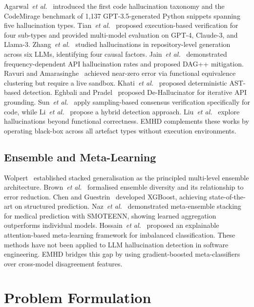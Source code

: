 \documentclass[11pt,a4paper]{article}
\newcommand{\method}{\textsc{EMHD}}
\newcommand{\etal}{\textit{et al.}}
\begin{document}
Agarwal~\etal~\cite{agarwal2025codemirage} introduced the first code hallucination taxonomy and the CodeMirage benchmark of 1,137 GPT-3.5-generated Python snippets spanning five hallucination types. Tian~\etal~\cite{tian2025codehalu} proposed execution-based verification for four sub-types and provided multi-model evaluation on GPT-4, Claude-3, and Llama-3. Zhang~\etal~\cite{zhang2025llmhallucinations} studied hallucinations in repository-level generation across six LLMs, identifying four causal factors. Jain~\etal~\cite{jain2025codeapi} demonstrated frequency-dependent API hallucination rates and proposed DAG++ mitigation. Ravuri and Amarasinghe~\cite{ravuri2025clustering} achieved near-zero error via functional equivalence clustering but require a live sandbox. Khati~\etal~\cite{khati2026ast} proposed deterministic AST-based detection. Eghbali and Pradel~\cite{eghbali2024dehallucinator} proposed De-Hallucinator for iterative API grounding. Sun~\etal~\cite{sun2025sampling} apply sampling-based consensus verification specifically for code, while Li~\etal~\cite{li2025hybrid} propose a hybrid detection approach. Liu~\etal~\cite{liu2025beyond} explore hallucinations beyond functional correctness. \method{} complements these works by operating black-box across all artefact types without execution environments.

\subsection{Ensemble and Meta-Learning}

Wolpert~\cite{wolpert1992stacking} established stacked generalisation as the principled multi-level ensemble architecture. Brown~\etal~\cite{brown2005diversity} formalised ensemble diversity and its relationship to error reduction. Chen and Guestrin~\cite{chen2016xgboost} developed XGBoost, achieving state-of-the-art on structured prediction. Naz~\etal~\cite{naz2025metaensemble} demonstrated meta-ensemble stacking for medical prediction with SMOTEENN, showing learned aggregation outperforms individual models. Hossain~\etal~\cite{hossain2025attention} proposed an explainable attention-based meta-learning framework for imbalanced classification. These methods have not been applied to LLM hallucination detection in software engineering. \method{} bridges this gap by using gradient-boosted meta-classifiers over cross-model disagreement features.


\section{Problem Formulation}
\label{sec:formulation}
\end{document}
